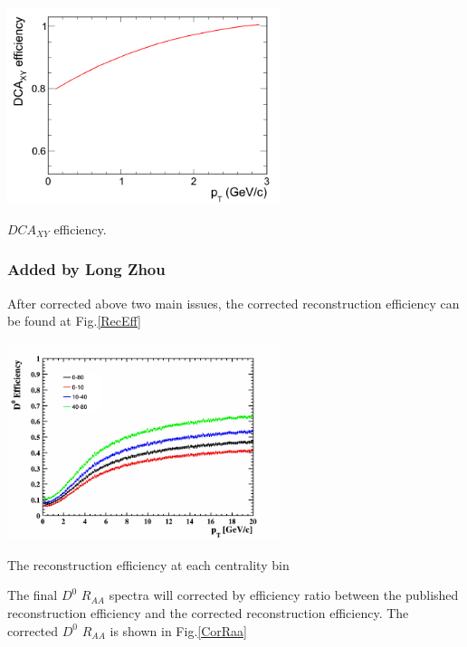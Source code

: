 \bfg \centering
\includegraphics[width=0.6\textwidth]{figure/Run11_YF/DCAxyEff.png}
\caption{$DCA_{XY}$ efficiency.}
\label{DCAxyeff}
\efg

\subsubsection{Added by Long Zhou}
After corrected above two main issues, the corrected reconstruction efficiency can be found at Fig.\ref{RecEff}

\bfg \centering
\includegraphics[width=0.6\textwidth]{figure/Run11_YF/rec_eff.png}
\caption{The reconstruction efficiency at each centrality bin}
\label{RecEff}
\efg



The final $D^0$ $R_{AA}$ spectra will corrected by efficiency ratio between the published reconstruction efficiency and the corrected reconstruction efficiency. The  corrected $D^0$ $R_{AA}$ is  shown in Fig.\ref{CorRaa}

